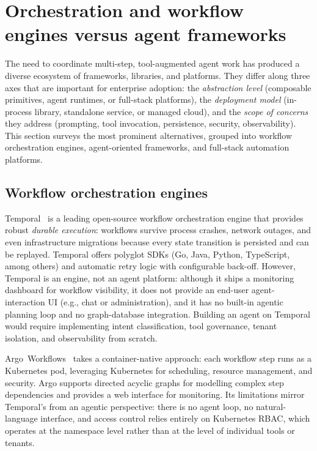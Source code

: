 \documentclass[a4paper]{sapthesis}
\begin{document}
\section{Orchestration and workflow engines versus agent frameworks}
\label{sec:orchestration-frameworks}

The need to coordinate multi-step, tool-augmented agent work has produced a
diverse ecosystem of frameworks, libraries, and platforms.  They differ
along three axes that are important for enterprise adoption: the
\emph{abstraction level} (composable primitives, agent runtimes, or
full-stack platforms), the \emph{deployment model} (in-process library,
standalone service, or managed cloud), and the \emph{scope of concerns}
they address (prompting, tool invocation, persistence, security,
observability).  This section surveys the most prominent alternatives,
grouped into workflow orchestration engines, agent-oriented frameworks, and
full-stack automation platforms.

\subsection{Workflow orchestration engines}

Temporal~\cite{temporal2023} is a leading open-source workflow orchestration
engine that provides robust \emph{durable execution}: workflows
survive process crashes, network outages, and even infrastructure
migrations because every state transition is persisted and can be replayed.
Temporal offers polyglot SDKs (Go, Java, Python, TypeScript, among others)
and automatic retry logic with configurable back-off.  However, Temporal is
an engine, not an agent platform: although it ships a monitoring dashboard
for workflow visibility, it does not provide an end-user agent-interaction
UI (e.g., chat or administration), and it has no built-in agentic planning
loop and no graph-database integration.  Building an
agent on Temporal would require implementing intent classification, tool
governance, tenant isolation, and observability from scratch.

Argo~Workflows~\cite{argoworkflows2023} takes a container-native approach:
each workflow step runs as a Kubernetes pod, leveraging Kubernetes for
scheduling, resource management, and security.  Argo supports directed
acyclic graphs for modelling complex step dependencies and provides a web
interface for monitoring.  Its limitations mirror Temporal's from an
agentic perspective: there is no agent loop, no natural-language interface,
and access control relies entirely on Kubernetes RBAC, which operates at
the namespace level rather than at the level of individual tools or
tenants.
\end{document}
